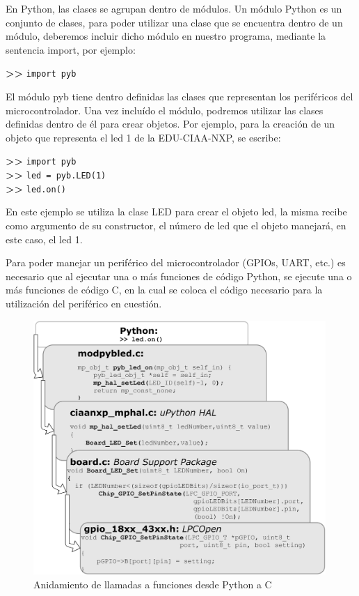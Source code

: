 En Python, las clases se agrupan dentro de módulos. Un módulo Python es un conjunto de clases, para poder utilizar una clase que se encuentra dentro de un módulo, deberemos incluir dicho módulo en nuestro programa, mediante la sentencia import, por ejemplo:

\textbf{{\fontsize{16}{16}\selectfont \textgreater\textgreater}} \texttt{import pyb}

El módulo pyb tiene dentro definidas las clases que representan los periféricos del microcontrolador. Una vez incluído el módulo, podremos utilizar las clases definidas dentro de él para crear objetos.
Por ejemplo, para la creación de un objeto que representa el led 1 de la EDU-CIAA-NXP, se escribe:

\textbf{{\fontsize{16}{16}\selectfont \textgreater\textgreater}} \texttt{import pyb}\\
\textbf{{\fontsize{16}{16}\selectfont \textgreater\textgreater}} \texttt{led = pyb.LED(1)}\\
\textbf{{\fontsize{16}{16}\selectfont \textgreater\textgreater}} \texttt{led.on()}

En este ejemplo se utiliza la clase LED para crear el objeto led, la misma recibe como argumento de su constructor, el número de led que el objeto manejará, en este caso, el led 1.

Para poder manejar un periférico del microcontrolador (GPIOs, UART, etc.) es necesario que al ejecutar una o más funciones de código Python, se ejecute una o más funciones de código C, en la cual se coloca el código necesario para la utilización del periférico en cuestión.

\begin{figure}[ht]
  \centering
    \includegraphics[width=0.99\textwidth]{Figures/fig_calls}
  \caption{Anidamiento de llamadas a funciones desde Python a C}
  \label{fig:calls}
\end{figure}

